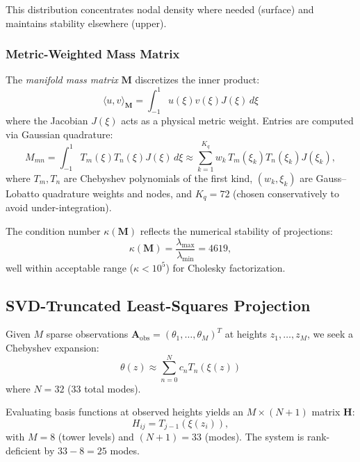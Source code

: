 \documentclass[11pt,a4paper]{article}
\begin{document}
This distribution concentrates nodal density where needed (surface) and maintains stability elsewhere (upper).

\subsubsection{Metric-Weighted Mass Matrix}

The \emph{manifold mass matrix} $\mathbf{M}$ discretizes the inner product:
\begin{equation}
\langle u, v \rangle_{\mathbf{M}} = \int_{-1}^{1} u(\xi) v(\xi) J(\xi) \, d\xi
\label{eq:metric_inner_product}
\end{equation}
where the Jacobian $J(\xi)$ acts as a physical metric weight. Entries are computed via Gaussian quadrature:
\begin{equation}
M_{mn} = \int_{-1}^{1} T_m(\xi) T_n(\xi) J(\xi) \, d\xi \approx \sum_{k=1}^{K_q} w_k \, T_m(\xi_k) T_n(\xi_k) J(\xi_k),
\label{eq:mass_matrix}
\end{equation}
where $T_m, T_n$ are Chebyshev polynomials of the first kind, $(w_k, \xi_k)$ are Gauss--Lobatto quadrature weights and nodes, and $K_q = 72$ (chosen conservatively to avoid under-integration).

The condition number $\kappa(\mathbf{M})$ reflects the numerical stability of projections:
\begin{equation}
\kappa(\mathbf{M}) = \frac{\lambda_{\max}}{\lambda_{\min}} = 4619,
\end{equation}
well within acceptable range ($\kappa < 10^5$) for Cholesky factorization.

\subsection{SVD-Truncated Least-Squares Projection}
\label{sec:methods:svd}

Given $M$ sparse observations $\mathbf{A}_{\mathrm{obs}} = (\theta_1, \ldots, \theta_M)^T$ at heights $z_1, \ldots, z_M$, we seek a Chebyshev expansion:
\begin{equation}
\theta(z) \approx \sum_{n=0}^{N} c_n T_n(\xi(z))
\end{equation}
where $N = 32$ (33 total modes).

Evaluating basis functions at observed heights yields an $M \times (N+1)$ matrix $\mathbf{H}$:
\begin{equation}
H_{ij} = T_{j-1}(\xi(z_i)),
\label{eq:h_matrix}
\end{equation}
with $M = 8$ (tower levels) and $(N+1) = 33$ (modes). The system is rank-deficient by $33 - 8 = 25$ modes.
\end{document}

